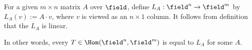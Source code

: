 \begin{definition}
    For a given $m \times n$ matrix $A$ over $\field$, define $L_A : \field^n \to \field^m$ by $L_A (v) := A \cdot v$, where $v$ is viewed as an $n \times 1$ column. It follows from definition that the $L_A$ is linear.

    In other words, every $T \in \Hom(\field^n, \field^m)$ is equal to $L_A$ for some $A$.
\end{definition}
